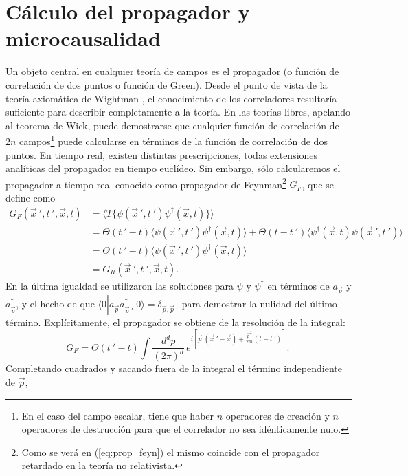 \section{Cálculo del propagador y microcausalidad}
Un objeto central en cualquier teoría de campos es el propagador (o función de correlación de dos puntos o función de Green). Desde el punto de vista de la teoría axiomática de Wightman \cite{Wightman:2016}, el conocimiento de los correladores resultaría suficiente para describir completamente a la teoría. En las teorías libres, apelando al teorema de Wick\cite{Gaudin:1960}, puede demostrarse que cualquier función de correlación de $2n$ campos\footnote{En el caso del campo escalar, tiene que haber $n$ operadores de creación y $n$ operadores de destrucción para que el correlador no sea idénticamente nulo.} puede calcularse en términos de la función de correlación de dos puntos. En tiempo real, existen distintas prescripciones, todas extensiones analíticas del propagador en tiempo euclídeo. Sin embargo, sólo calcularemos el propagador a tiempo real conocido como propagador de Feynman\footnote{Como se verá en (\ref{eq:prop_feyn}) el mismo coincide con el propagador retardado en la teoría no relativista.} $G_F$, que se define como
\begin{equation}
\begin{split}
G_F(\vec{x}\:',t\:',\vec{x},t)&=\langle T \{\psi(\vec{x}\:',t\:')\psi^{\dag}(\vec{x},t)\}\rangle\\
&=\Theta (t\:'-t)\langle \psi(\vec{x}\:',t\:')\psi^{\dag}(\vec{x},t)\rangle + \Theta (t-t\:')\langle \psi^{\dag}(\vec{x},t)\psi(\vec{x}\:',t\:')\rangle \\
&=\Theta (t\:'-t)\langle \psi(\vec{x}\:',t\:')\psi^{\dag}(\vec{x},t)\rangle \\
&=G_R(\vec{x}\:',t\:',\vec{x},t).
\end{split}
\label{eq:prop_feyn}
\end{equation}
En la última igualdad se utilizaron las soluciones para $\psi$ y $\psi^{\dag}$ en términos de $a_{\vec{p}}$ y $a^{\dag}_{\vec{p}}$, y el hecho de que $\langle 0| a_{\vec{p}}a^{\dag}_{\vec{p}\:'}|0\rangle=\delta_{\vec{p},\vec{p}\:'}$ para demostrar la nulidad del último término. Explícitamente, el propagador se obtiene de la resolución de la integral:
\begin{equation}
G_F=\Theta (t\:'-t)\int \frac{d^dp}{(2\pi)^d}\,e^{i[\vec{p}\:(\vec{x}\:'-\vec{x})+\frac{\vec{p}^2}{2m}(t-t\:')]}.\,
\end{equation}
Completando cuadrados y sacando fuera de la integral el término independiente de $\vec{p}$,
